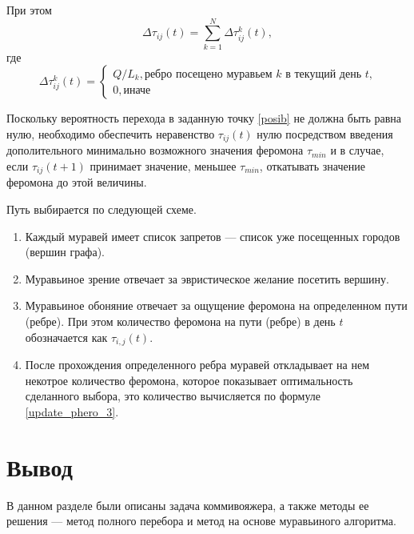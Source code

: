 При этом
\begin{equation}
	\label{update_phero_2}
	\Delta \tau_{ij}(t) = \sum_{k=1}^N \Delta \tau^k_{ij}(t),
\end{equation}
где
\begin{equation}
	\label{update_phero_3}
	\Delta\tau^k_{ij}(t) = \begin{cases}
		Q/L_{k}, \textrm{ребро посещено муравьем $k$ в текущий день $t$,} \\
		0, \textrm{иначе}
	\end{cases}
\end{equation}

Поскольку вероятность перехода в заданную точку \ref{posib} не должна быть равна нулю, необходимо обеспечить неравенство $\tau_{ij} (t)$ нулю посредством введения дополительного минимально возможного значения феромона $\tau_{min}$ и в случае, если $\tau_{ij} (t+1)$ принимает значение, меньшее $\tau_{min}$, откатывать значение феромона до этой величины. 


Путь выбирается по следующей схеме.
\begin{enumerate}
	\item Каждый муравей имеет список запретов --- список уже посещенных городов (вершин графа).
	\item Муравьиное зрение отвечает за эвристическое желание посетить вершину.
	\item Муравьиное обоняние отвечает за ощущение феромона на определенном пути (ребре). При этом количество феромона на пути (ребре) в день $t$ обозначается как $\tau_{i, j} (t)$.
	\item После прохождения определенного ребра муравей откладывает на нем некотрое количество феромона, которое показывает оптимальность сделанного выбора, это количество вычисляется по формуле \eqref{update_phero_3}.
\end{enumerate}

\section*{Вывод}
В данном разделе были описаны задача коммивояжера, а также методы ее решения --- метод полного перебора и метод на основе муравьиного алгоритма.